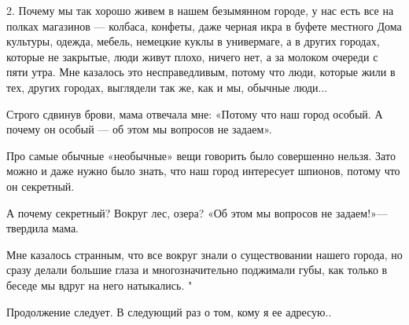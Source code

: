 2. Почему мы так хорошо живем в нашем безымянном городе, у нас есть все на
полках магазинов — колбаса, конфеты, даже черная икра в буфете местного
Дома культуры, одежда, мебель, немецкие куклы в универмаге, а в других
городах, которые не закрытые, люди живут плохо, ничего нет, а за молоком
очереди с пяти утра. Мне казалось это несправедливым, потому что люди,
которые жили в тех, других городах, выглядели так же, как и мы, обычные
люди... 

Строго сдвинув брови, мама отвечала мне: «Потому что наш город особый. А почему
он особый — об этом мы вопросов не задаем».

Про самые обычные «необычные» вещи говорить было совершенно нельзя. Зато можно
и даже нужно было знать, что наш город интересует шпионов, потому что он
секретный.

А почему секретный? Вокруг лес, озера? «Об этом мы вопросов не задаем!»—
твердила мама. 

Мне казалось странным, что все вокруг знали о существовании нашего города, но
сразу делали большие глаза и многозначительно поджимали губы, как только в
беседе мы вдруг на него натыкались. "

Продолжение следует. В следующий раз о том, кому я ее адресую..
